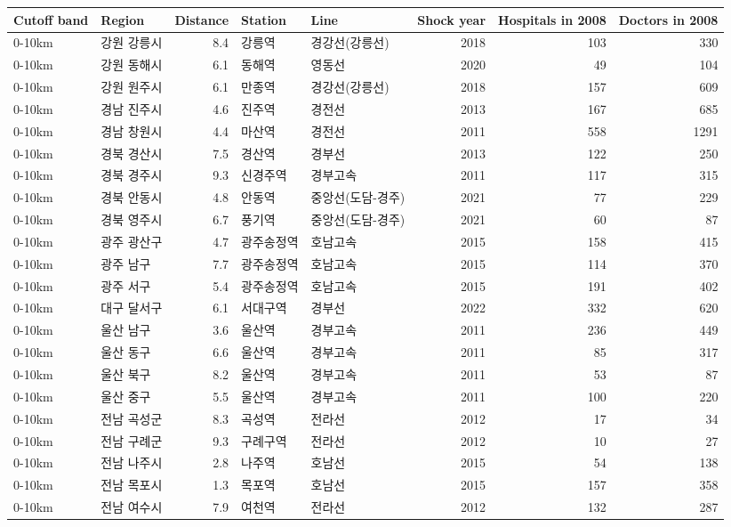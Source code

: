 \begin{tabular}{llrllrrr}
\toprule
Cutoff band & Region & Distance & Station & Line & Shock year & Hospitals in 2008 & Doctors in 2008\\
\midrule
0-10km & 강원 강릉시 & 8.4 & 강릉역 & 경강선(강릉선) & 2018 & 103 & 330\\
0-10km & 강원 동해시 & 6.1 & 동해역 & 영동선 & 2020 & 49 & 104\\
0-10km & 강원 원주시 & 6.1 & 만종역 & 경강선(강릉선) & 2018 & 157 & 609\\
0-10km & 경남 진주시 & 4.6 & 진주역 & 경전선 & 2013 & 167 & 685\\
0-10km & 경남 창원시 & 4.4 & 마산역 & 경전선 & 2011 & 558 & 1291\\
0-10km & 경북 경산시 & 7.5 & 경산역 & 경부선 & 2013 & 122 & 250\\
0-10km & 경북 경주시 & 9.3 & 신경주역 & 경부고속 & 2011 & 117 & 315\\
0-10km & 경북 안동시 & 4.8 & 안동역 & 중앙선(도담-경주) & 2021 & 77 & 229\\
0-10km & 경북 영주시 & 6.7 & 풍기역 & 중앙선(도담-경주) & 2021 & 60 & 87\\
0-10km & 광주 광산구 & 4.7 & 광주송정역 & 호남고속 & 2015 & 158 & 415\\
0-10km & 광주 남구 & 7.7 & 광주송정역 & 호남고속 & 2015 & 114 & 370\\
0-10km & 광주 서구 & 5.4 & 광주송정역 & 호남고속 & 2015 & 191 & 402\\
0-10km & 대구 달서구 & 6.1 & 서대구역 & 경부선 & 2022 & 332 & 620\\
0-10km & 울산 남구 & 3.6 & 울산역 & 경부고속 & 2011 & 236 & 449\\
0-10km & 울산 동구 & 6.6 & 울산역 & 경부고속 & 2011 & 85 & 317\\
0-10km & 울산 북구 & 8.2 & 울산역 & 경부고속 & 2011 & 53 & 87\\
0-10km & 울산 중구 & 5.5 & 울산역 & 경부고속 & 2011 & 100 & 220\\
0-10km & 전남 곡성군 & 8.3 & 곡성역 & 전라선 & 2012 & 17 & 34\\
0-10km & 전남 구례군 & 9.3 & 구례구역 & 전라선 & 2012 & 10 & 27\\
0-10km & 전남 나주시 & 2.8 & 나주역 & 호남선 & 2015 & 54 & 138\\
0-10km & 전남 목포시 & 1.3 & 목포역 & 호남선 & 2015 & 157 & 358\\
0-10km & 전남 여수시 & 7.9 & 여천역 & 전라선 & 2012 & 132 & 287\\

\end{tabular}
